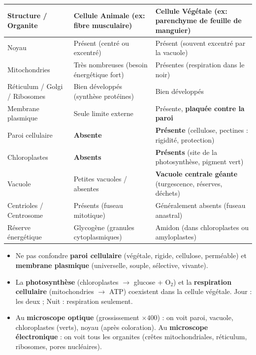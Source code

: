 \documentclass[11pt]{article}
\newcommand{\cle}[1]{{\popxbold\color{popdark}#1}}
\begin{document}
\begin{center}
\begin{tabularx}{\linewidth}{|l|X|X|}
\hline
\rowcolor{popblueL} \textbf{Structure / Organite} & \textbf{Cellule Animale (ex: fibre musculaire)} & \textbf{Cellule Végétale (ex: parenchyme de feuille de manguier)} \\
\hline
Noyau & Présent (centré ou excentré) & Présent (souvent excentré par la vacuole) \\
\hline
Mitochondries & Très nombreuses (besoin énergétique fort) & Présentes (respiration dans le noir) \\
\hline
Réticulum / Golgi / Ribosomes & Bien développés (synthèse protéines) & Bien développés \\
\hline
Membrane plasmique & Seule limite externe & Présente, \textbf{plaquée contre la paroi} \\
\hline
\cle{Paroi cellulaire} & \textbf{Absente} & \textbf{Présente} (cellulose, pectines : rigidité, protection) \\
\hline
\cle{Chloroplastes} & \textbf{Absents} & \textbf{Présents} (site de la photosynthèse, pigment vert) \\
\hline
\cle{Vacuole} & Petites vacuoles / absentes & \textbf{Vacuole centrale géante} (turgescence, réserves, déchets) \\
\hline
Centrioles / Centrosome & Présents (fuseau mitotique) & Généralement absents (fuseau anastral) \\
\hline
Réserve énergétique & Glycogène (granules cytoplasmiques) & Amidon (dans chloroplastes ou amyloplastes) \\
\hline
\end{tabularx}
\end{center}

\begin{attention}
\begin{itemize}
\item Ne pas confondre \textbf{paroi cellulaire} (végétale, rigide, cellulose, perméable) et \textbf{membrane plasmique} (universelle, souple, sélective, vivante).
\item La \textbf{photosynthèse} (chloroplastes $\rightarrow$ glucose + O$_2$) et la \textbf{respiration cellulaire} (mitochondries $\rightarrow$ ATP) coexistent dans la cellule végétale. Jour : les deux ; Nuit : respiration seulement.
\item Au \textbf{microscope optique} (grossissement $\times 400$) : on voit paroi, vacuole, chloroplastes (verts), noyau (après coloration). Au \textbf{microscope électronique} : on voit tous les organites (crêtes mitochondriales, réticulum, ribosomes, pores nucléaires).
\end{itemize}
\end{attention}
\end{document}
